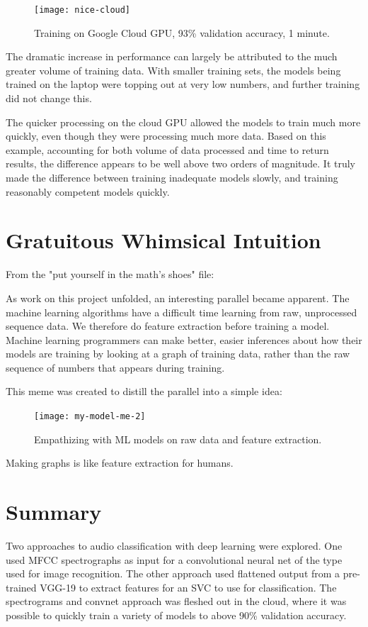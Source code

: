 \documentclass[sigconf]{acmart}
\begin{document}
\begin{figure}[h]
  \centering
  \texttt{[image: nice-cloud]}
  \caption{Training on Google Cloud GPU, 93\% validation accuracy, 1 minute.}
\end{figure}

The dramatic increase in performance can largely be attributed to the much greater volume of
training data. With smaller training sets, the models being trained on the laptop were topping
out at very low numbers, and further training did not change this.

The quicker processing on the cloud GPU allowed the models to train much more quickly, even
though they were processing much more data. 
Based on this example, accounting for both volume of data processed and time to return
results, the difference appears to be well above two orders of magnitude.
It truly made the difference between training 
inadequate models slowly, and training reasonably competent models quickly.

\section{Gratuitous Whimsical Intuition}

From the "put yourself in the math's shoes" file:

As work on this project unfolded, an interesting parallel became apparent.
The machine learning algorithms have a difficult time learning from raw, unprocessed
sequence data. We therefore do feature extraction before training a model. Machine
learning programmers can make better, easier inferences about how their models 
are training by looking at a graph of training data, rather than the raw sequence of
numbers that appears during training.

This meme was created to distill the parallel into a simple idea:

\begin{figure}[h]
  \centering
  \texttt{[image: my-model-me-2]}
  \caption{Empathizing with ML models on raw data and feature extraction.}
\end{figure}

Making graphs is like feature extraction for humans.



\section{Summary}
Two approaches to audio classification with deep learning were explored. One used
MFCC spectrographs as input for a convolutional neural net of the type used for image recognition.
The other approach used flattened output from a pre-trained VGG-19 to extract
features for an SVC to use for classification. The spectrograms and convnet approach
was fleshed out in the cloud, where it was possible to quickly train a variety of models
to above 90\% validation accuracy. 
\end{document}
